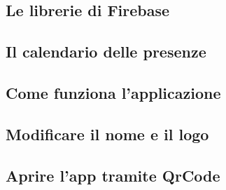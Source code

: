 \newpage

\subsection{Le librerie di Firebase}

\subsection{Il calendario delle presenze}

\subsection{Come funziona l'applicazione}

\subsection{Modificare il nome e il logo}

\subsection{Aprire l'app tramite QrCode}